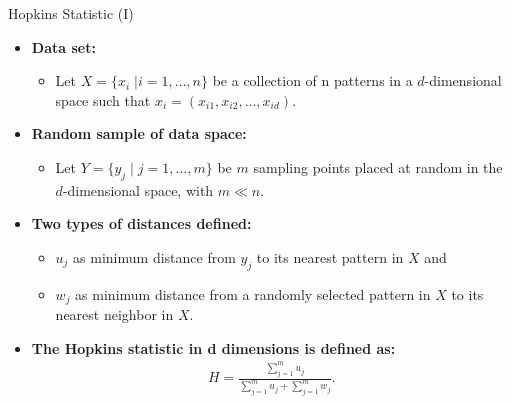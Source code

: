 \begin{frame}{Hopkins Statistic (I)}
	\begin{itemize}
		\item \textbf{Data set:}
		      \begin{itemize}
			      \item Let $X = \{x_i \; \vert i=1,\ldots,n\}$ be a collection of n
			            patterns in a $d$-dimensional space such that $x_i = (x_{i1},
				            x_{i2}, \ldots, x_{id})$.
		      \end{itemize}
		\item \textbf{Random sample of data space:}
		      \begin{itemize}
			      \item Let $Y = \{y_j \; \vert \; j=1, \ldots, m\}$ be $m$ sampling
			            points placed at random in the $d$-dimensional space, with $m \ll
				            n$.
		      \end{itemize}
		\item \textbf{Two types of distances defined:}
		      \begin{itemize}
			      \item $u_j$ as minimum distance from $y_j$ to its nearest pattern
			            in $X$ and
			      \item $w_j$ as minimum distance from a randomly selected pattern in
			            $X$ to its nearest neighbor in $X$.
		      \end{itemize}
		\item \textbf{The {\color{airforceblue}Hopkins} statistic in d
			      dimensions is defined as:}
		      \begin{align*}
			      H = \frac{\sum_{j=1}^{m} u_j}{\sum_{j=1}^{m}u_j + \sum_{j=1}^{m}
				      w_j}.
		      \end{align*}
	\end{itemize}
\end{frame}

